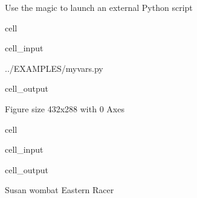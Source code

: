 \documentclass[letterpaper,10pt,english]{jupyterBook}
\begin{document}
\sphinxAtStartPar
Use the  magic to launch an external Python script

\begin{sphinxuseclass}{cell}\begin{sphinxVerbatimInput}

\begin{sphinxuseclass}{cell_input}
\begin{sphinxVerbatim}[commandchars=\\\{\}]
 ../EXAMPLES/my\PYGZus{}vars.py
\end{sphinxVerbatim}

\end{sphinxuseclass}\end{sphinxVerbatimInput}
\begin{sphinxVerbatimOutput}

\begin{sphinxuseclass}{cell_output}
\begin{sphinxVerbatim}[commandchars=\\\{\}]
\PYGZlt{}Figure size 432x288 with 0 Axes\PYGZgt{}
\end{sphinxVerbatim}

\end{sphinxuseclass}\end{sphinxVerbatimOutput}

\end{sphinxuseclass}
\begin{sphinxuseclass}{cell}\begin{sphinxVerbatimInput}

\begin{sphinxuseclass}{cell_input}
\begin{sphinxVerbatim}[commandchars=\\\{\}]
\end{sphinxVerbatim}

\end{sphinxuseclass}\end{sphinxVerbatimInput}
\begin{sphinxVerbatimOutput}

\begin{sphinxuseclass}{cell_output}
\begin{sphinxVerbatim}[commandchars=\\\{\}]
Susan
wombat
Eastern Racer
\end{sphinxVerbatim}

\end{sphinxuseclass}\end{sphinxVerbatimOutput}

\end{sphinxuseclass}
\begin{DUlineblock}{0em}
\item[] 
\end{DUlineblock}
\end{document}

